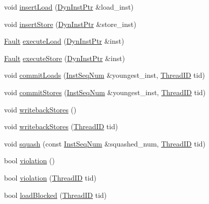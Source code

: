 \begin{DoxyCompactItemize}
\item 
void \hyperlink{classLSQ_ad22b3ecafed2bcd9c59fcab049a1cb98}{insertLoad} (\hyperlink{classLSQ_a028ce10889c5f6450239d9e9a7347976}{DynInstPtr} \&load\_\-inst)
\item 
void \hyperlink{classLSQ_a6a4b4e51bfff3639932ebaba45e8a282}{insertStore} (\hyperlink{classLSQ_a028ce10889c5f6450239d9e9a7347976}{DynInstPtr} \&store\_\-inst)
\item 
\hyperlink{classRefCountingPtr}{Fault} \hyperlink{classLSQ_a30c6332142c2ecca389ed6ee463c692b}{executeLoad} (\hyperlink{classLSQ_a028ce10889c5f6450239d9e9a7347976}{DynInstPtr} \&inst)
\item 
\hyperlink{classRefCountingPtr}{Fault} \hyperlink{classLSQ_aad78b8a37ee5c61e47df58dd39980340}{executeStore} (\hyperlink{classLSQ_a028ce10889c5f6450239d9e9a7347976}{DynInstPtr} \&inst)
\item 
void \hyperlink{classLSQ_af03ccef8cb6360230dd0060c8996be2d}{commitLoads} (\hyperlink{inst__seq_8hh_a258d93d98edaedee089435c19ea2ea2e}{InstSeqNum} \&youngest\_\-inst, \hyperlink{base_2types_8hh_ab39b1a4f9dad884694c7a74ed69e6a6b}{ThreadID} tid)
\item 
void \hyperlink{classLSQ_a096edcd9c962aec4ad10871da44aa5b9}{commitStores} (\hyperlink{inst__seq_8hh_a258d93d98edaedee089435c19ea2ea2e}{InstSeqNum} \&youngest\_\-inst, \hyperlink{base_2types_8hh_ab39b1a4f9dad884694c7a74ed69e6a6b}{ThreadID} tid)
\item 
void \hyperlink{classLSQ_a5f04e29d6f6feb8b86460491f2ba7547}{writebackStores} ()
\item 
void \hyperlink{classLSQ_aebf9f82a83e61cd390df68a2fb7a8641}{writebackStores} (\hyperlink{base_2types_8hh_ab39b1a4f9dad884694c7a74ed69e6a6b}{ThreadID} tid)
\item 
void \hyperlink{classLSQ_a74283dfde2ab06c84e10bd85000c168b}{squash} (const \hyperlink{inst__seq_8hh_a258d93d98edaedee089435c19ea2ea2e}{InstSeqNum} \&squashed\_\-num, \hyperlink{base_2types_8hh_ab39b1a4f9dad884694c7a74ed69e6a6b}{ThreadID} tid)
\item 
bool \hyperlink{classLSQ_a4f720bbfb5fdefdb23516500eeb0b4de}{violation} ()
\item 
bool \hyperlink{classLSQ_a24dee29bada56cd1c98a7c3d80e77b6e}{violation} (\hyperlink{base_2types_8hh_ab39b1a4f9dad884694c7a74ed69e6a6b}{ThreadID} tid)
\item 
bool \hyperlink{classLSQ_a95b69602ad810ff8ec5d2b0ea2619945}{loadBlocked} (\hyperlink{base_2types_8hh_ab39b1a4f9dad884694c7a74ed69e6a6b}{ThreadID} tid)
\item 

\end{DoxyCompactItemize}
